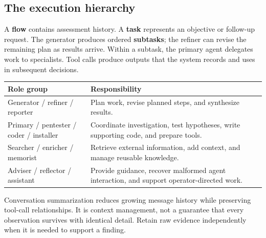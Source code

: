 \documentclass[11pt,letterpaper]{article}
\newcommand{\src}[1]{\cite{#1}}
\begin{document}
\subsection{The execution hierarchy}
A \textbf{flow} contains assessment history. A \textbf{task} represents an
objective or follow-up request. The generator produces ordered
\textbf{subtasks}; the refiner can revise the remaining plan as results arrive.
Within a subtask, the primary agent delegates work to specialists. Tool calls
produce outputs that the system records and uses in subsequent decisions.
\src{flow}

\begin{tabularx}{\textwidth}{@{}L{0.27\textwidth}Y@{}}
\toprule
\textbf{Role group} & \textbf{Responsibility}\\
\midrule
Generator / refiner / reporter & Plan work, revise planned steps, and synthesize results.\\
Primary / pentester / coder / installer & Coordinate investigation, test hypotheses,
write supporting code, and prepare tools.\\
Searcher / enricher / memorist & Retrieve external information, add context,
and manage reusable knowledge.\\
Adviser / reflector / assistant & Provide guidance, recover malformed agent
interaction, and support operator-directed work.\\
\bottomrule
\end{tabularx}

Conversation summarization reduces growing message history while preserving
tool-call relationships. It is context management, not a guarantee that every
observation survives with identical detail. Retain raw evidence independently
when it is needed to support a finding. \src{summary}

\clearpage
\end{document}
